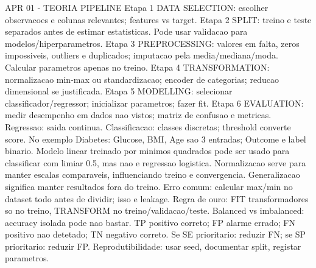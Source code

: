 APR 01 - TEORIA PIPELINE
Etapa 1 DATA SELECTION: escolher observacoes e colunas relevantes; features vs target.
Etapa 2 SPLIT: treino e teste separados antes de estimar estatisticas. Pode usar validacao para modelos/hiperparametros.
Etapa 3 PREPROCESSING: valores em falta, zeros impossiveis, outliers e duplicados; imputacao pela media/mediana/moda. Calcular parametros apenas no treino.
Etapa 4 TRANSFORMATION: normalizacao min-max ou standardizacao; encoder de categorias; reducao dimensional se justificada.
Etapa 5 MODELLING: selecionar classificador/regressor; inicializar parametros; fazer fit.
Etapa 6 EVALUATION: medir desempenho em dados nao vistos; matriz de confusao e metricas.
Regressao: saida continua. Classificacao: classes discretas; threshold converte score.
No exemplo Diabetes: Glucose, BMI, Age sao 3 entradas; Outcome e label binario.
Modelo linear treinado por minimos quadrados pode ser usado para classificar com limiar 0.5, mas nao e regressao logistica.
Normalizacao serve para manter escalas comparaveis, influenciando treino e convergencia.
Generalizacao significa manter resultados fora do treino.
Erro comum: calcular max/min no dataset todo antes de dividir; isso e leakage.
Regra de ouro: FIT transformadores so no treino, TRANSFORM no treino/validacao/teste.
Balanced vs imbalanced: accuracy isolada pode nao bastar.
TP positivo correto; FP alarme errado; FN positivo nao detetado; TN negativo correto.
Se SE prioritario: reduzir FN; se SP prioritario: reduzir FP.
Reprodutibilidade: usar seed, documentar split, registar parametros.